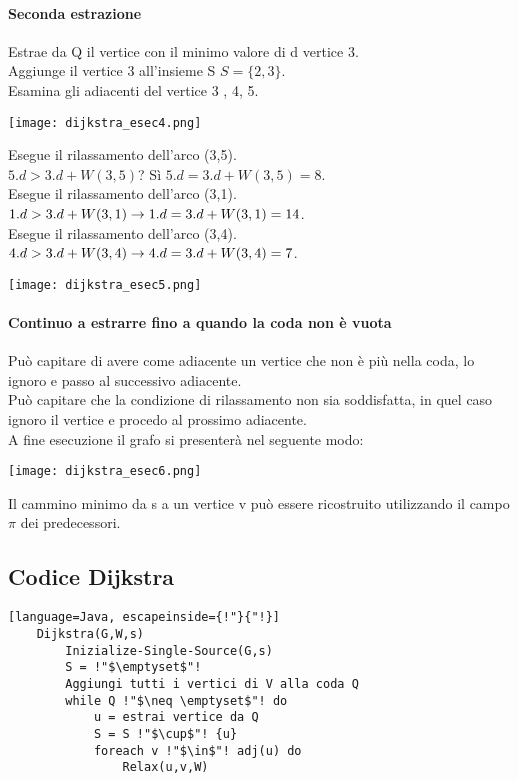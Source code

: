 \paragraph*{Seconda estrazione}
Estrae da Q il vertice con il minimo valore di d \ra vertice 3.\\
Aggiunge il vertice 3 all'insieme S \ra $S=\{2,3\}$.\\
Esamina gli adiacenti del vertice 3 , 4, 5.
\begin{center}
    \texttt{[image: dijkstra\_esec4.png]}
\end{center}
Esegue il rilassamento dell'arco (3,5).\\
$5.d > 3.d + W(3,5)$? Sì \ra $5.d = 3.d + W(3,5) = 8$.\\
Esegue il rilassamento dell'arco (3,1).\\
$1.d > 3.d + W(3,1) \rightarrow 1.d = 3.d + W(3,1) = 14$.\\
Esegue il rilassamento dell'arco (3,4).\\
$4.d > 3.d + W(3,4) \rightarrow 4.d = 3.d + W(3,4) = 7$.
\begin{center}
    \texttt{[image: dijkstra\_esec5.png]}
\end{center}
\paragraph*{Continuo a estrarre fino a quando la coda non è vuota}
Può capitare di avere come adiacente un vertice che non è più nella coda, lo ignoro e passo
al successivo adiacente.\\
Può capitare che la condizione di rilassamento non sia soddisfatta, in quel caso ignoro il vertice
e procedo al prossimo adiacente.\\
A fine esecuzione il grafo si presenterà nel seguente modo:
\begin{center}
    \texttt{[image: dijkstra\_esec6.png]}
\end{center}
Il cammino minimo da s a un vertice v può essere ricostruito utilizzando il campo $\pi$ dei
predecessori.
\subsection*{Codice Dijkstra}
\begin{lstlisting}[language=Java, escapeinside={!"}{"!}]
    Dijkstra(G,W,s)
        Inizialize-Single-Source(G,s)
        S = !"$\emptyset$"!
        Aggiungi tutti i vertici di V alla coda Q
        while Q !"$\neq \emptyset$"! do
            u = estrai vertice da Q
            S = S !"$\cup$"! {u}
            foreach v !"$\in$"! adj(u) do
                Relax(u,v,W) 
\end{lstlisting}
